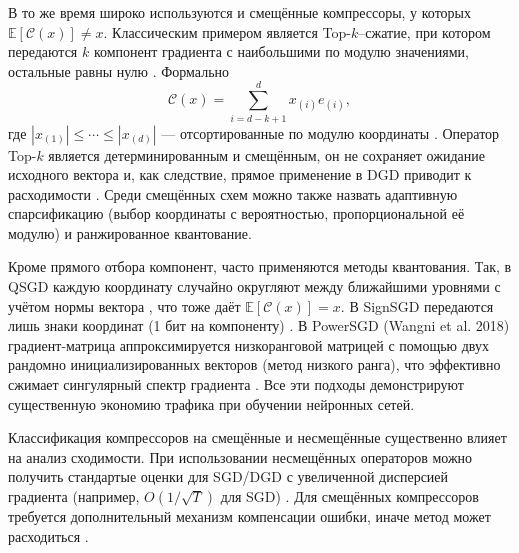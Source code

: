 В то же время широко используются и смещённые компрессоры, у которых \(\mathbb{E}[\mathcal{C}(x)]\neq x\). Классическим примером является Top-\(k\)–сжатие, при котором передаются \(k\) компонент градиента с наибольшими по модулю значениями, остальные равны нулю \cite{Beznosikov2023}. Формально
\begin{equation}
\mathcal{C}(x) = \sum_{i=d-k+1}^d x_{(i)} e_{(i)},
\end{equation}
где \(|x_{(1)}|\le\cdots\le|x_{(d)}|\) — отсортированные по модулю координаты \cite{Beznosikov2023}. Оператор Top-\(k\) является детерминированным и смещённым, он не сохраняет ожидание исходного вектора и, как следствие, прямое применение в DGD приводит к расходимости \cite{Beznosikov2023}. Среди смещённых схем можно также назвать адаптивную спарсификацию (выбор координаты с вероятностью, пропорциональной её модулю) \cite{Beznosikov2023} и ранжированное квантование. 

Кроме прямого отбора компонент, часто применяются методы квантования. Так, в QSGD каждую координату случайно округляют между ближайшими уровнями с учётом нормы вектора \cite{Alistarh2017}, что тоже даёт \(\mathbb{E}[\mathcal{C}(x)] = x\). В SignSGD передаются лишь знаки координат (1 бит на компоненту) \cite{Bernstein2018}. В PowerSGD (Wangni et al. 2018) градиент-матрица аппроксимируется низкоранговой матрицей с помощью двух рандомно инициализированных векторов (метод низкого ранга), что эффективно сжимает сингулярный спектр градиента \cite{Vogels2019}. Все эти подходы демонстрируют существенную экономию трафика при обучении нейронных сетей.

Классификация компрессоров на смещённые и несмещённые существенно влияет на анализ сходимости. При использовании несмещённых операторов можно получить стандартые оценки для SGD/DGD с увеличенной дисперсией градиента (например, \(O(1/\sqrt{T})\) для SGD) \cite{Alistarh2017,Horvath2022}. Для смещённых компрессоров требуется дополнительный механизм компенсации ошибки, иначе метод может расходиться \cite{Beznosikov2023}. 

